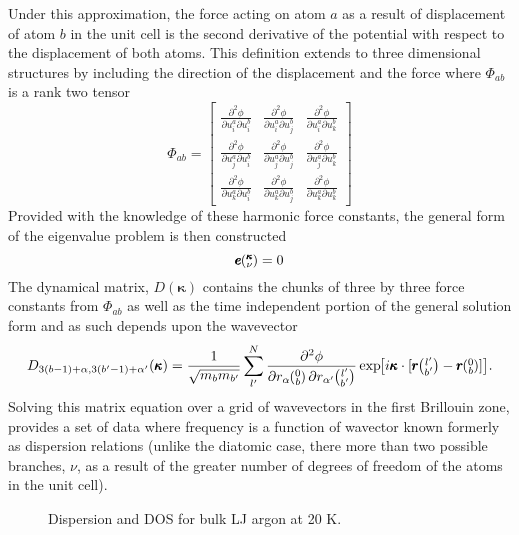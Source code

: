 %
Under this approximation, the force acting on atom $a$ as a result of displacement of atom $b$ in the unit cell is the second derivative of the potential with respect to the displacement of both atoms. This definition extends to three dimensional structures by including the direction of the displacement and the force where $\Phi_{ab}$ is a rank two tensor
%
\begin{equation}
\Phi_{ab}=
\begin{bmatrix}
  \frac{\partial^2 \phi}{\partial u^a_i\partial u^b_i} & \frac{\partial^2 \phi}{\partial u^a_i\partial u^b_j} &\frac{\partial^2 \phi}{\partial u^a_i\partial u^b_k}\\
  \frac{\partial^2 \phi}{\partial u^a_j\partial u^b_i} & \frac{\partial^2 \phi}{\partial u^a_j\partial u^b_j} &\frac{\partial^2 \phi}{\partial u^a_j\partial u^b_k}\\
\frac{\partial^2 \phi}{\partial u^a_k\partial u^b_i} & \frac{\partial^2 \phi}{\partial u^a_k\partial u^b_j} &\frac{\partial^2 \phi}{\partial u^a_k\partial u^b_k}
 \end{bmatrix}
\end{equation}
Provided with the knowledge of these harmonic force constants, the general form of the eigenvalue problem is then constructed \cite{dove_introduction_1993-3}
\begin{equation}
[D(\pmb{\kappa})-I\omega^2\kv]\pmb{e}\kv = 0
\end{equation}
%
The dynamical matrix, $D(\pmb{\kappa})$ contains the chunks of three by three force constants from $\Phi_{ab}$ as well as the time independent portion of the general solution form and as such depends upon the wavevector
\begin{equation}
D_{3(b-1)+\alpha,3(b'-1)+\alpha'}(\pmb{\kappa})=\frac{1}{\sqrt{m_bm_{b'}}}\sum_{l'}^N\frac{\partial^2\phi}{\partial r_\alpha \Ob \partial r_{\alpha'} \lbp} \EXP{i\pmb{\kappa}\cdot [\pmb{r}\lbp-\pmb{r}\Ob]}.
\end{equation}
Solving this matrix equation over a grid of wavevectors in the first Brillouin zone, provides a set of data where frequency is a function of wavector known formerly as dispersion relations (unlike the diatomic case, there more than two possible branches, $\nu$, as a result of the greater number of degrees of freedom of the atoms in the unit cell).

\begin{figure*}%
\begin{center}
\renewcommand{\figure}{Fig.}
\caption{Dispersion and DOS for bulk LJ argon at 20 K.}
\label{FIG:bulk_dispersion}
\end{center}
\end{figure*}

